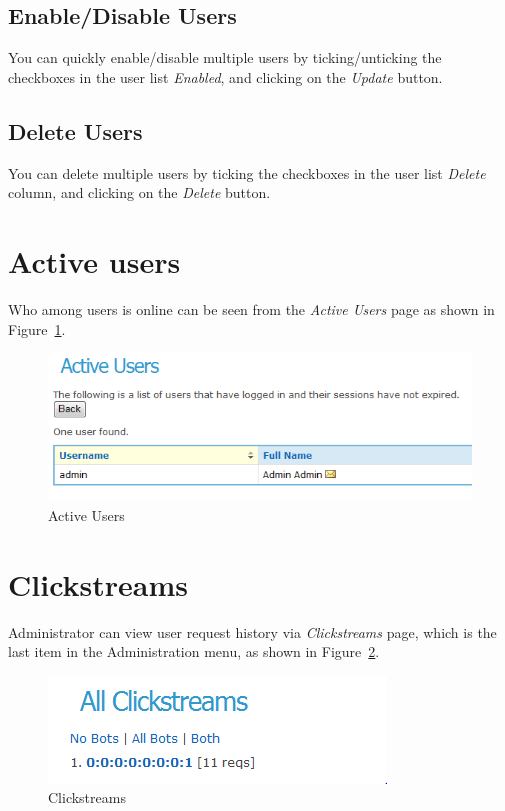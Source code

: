 \subsection{Enable/Disable Users}
You can quickly enable/disable multiple users by
ticking/unticking the checkboxes in the user list \emph{Enabled}, and clicking
on the \emph{Update} button.

\subsection{Delete Users}
You can delete multiple users by
ticking the checkboxes in the user list \emph{Delete} column, and
clicking on the \emph{Delete} button.

\section{Active users}
Who among users is online can be seen from the \emph{Active Users} page as
shown in Figure~\ref{fig:currentuser}.
\begin{figure}[hb!]
\centering
\includegraphics[scale=0.4]{currentuser}
\caption{Active Users}
\label{fig:currentuser}
\end{figure}

\section{Clickstreams}
Administrator can view user request history via \emph{Clickstreams} page, which 
is the last item in the Administration menu, as
shown in Figure~\ref{fig:allclickstreams}.
\begin{figure} [hb!]
\centering
\includegraphics[scale=0.5]{allclickstreams}
\caption{Clickstreams}
\label{fig:allclickstreams}
\end{figure}
